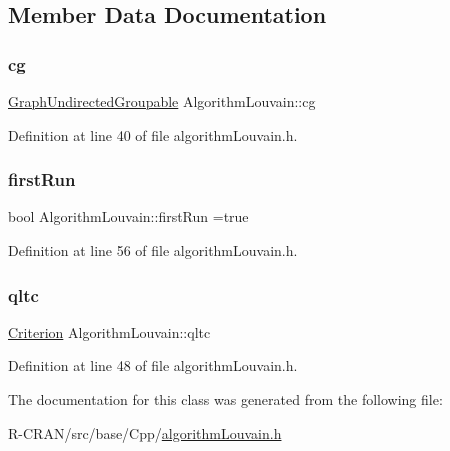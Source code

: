 \subsection{Member Data Documentation}
\mbox{\label{classAlgorithmLouvain_aa98d18e2734216898993b4269f84ac7b}} 
\subsubsection{\texorpdfstring{cg}{cg}}
{\footnotesize\ttfamily \hyperlink{classGraphUndirectedGroupable}{Graph\+Undirected\+Groupable} Algorithm\+Louvain\+::cg\hspace{0.3cm}{\ttfamily [private]}}



Definition at line 40 of file algorithm\+Louvain.\+h.

\mbox{\label{classAlgorithmLouvain_a193c2370556007f36b44e03e2df47c2f}} 
\subsubsection{\texorpdfstring{first\+Run}{firstRun}}
{\footnotesize\ttfamily bool Algorithm\+Louvain\+::first\+Run =true\hspace{0.3cm}{\ttfamily [private]}}



Definition at line 56 of file algorithm\+Louvain.\+h.

\mbox{\label{classAlgorithmLouvain_ab3b6b2b7f256ca9962d685d6507fad90}} 
\subsubsection{\texorpdfstring{qltc}{qltc}}
{\footnotesize\ttfamily \hyperlink{classCriterion}{Criterion} Algorithm\+Louvain\+::qltc\hspace{0.3cm}{\ttfamily [private]}}



Definition at line 48 of file algorithm\+Louvain.\+h.



The documentation for this class was generated from the following file\+:\begin{DoxyCompactItemize}
\item 
R-\/\+C\+R\+A\+N/src/base/\+Cpp/\hyperlink{algorithmLouvain_8h}{algorithm\+Louvain.\+h}\end{DoxyCompactItemize}
